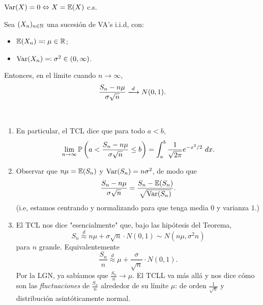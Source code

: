 \begin{note}
	$\operatorname{Var}(X) = 0 \Leftrightarrow X = \mathbb{E}(X)$ c.s.
\end{note}

\begin{theorem}
	Sea $(X_{n})_{n \in \mathbb{N}}$ una sucesión de VA's i.i.d, con:
	\begin{itemize}
		\item $\mathbb{E}(X_{n}) \eqcolon \mu \in \mathbb{R}$;

		\item $\operatorname{Var}(X_{n}) \eqcolon \sigma^{2} \in (0, \infty)$.
	\end{itemize}
	Entonces, en el límite cuando $n \to \infty$,
	\[ \frac{S_{n} - n \mu}{\sigma \sqrt{n}} \xlongrightarrow{d} N(0,1). \]
\end{theorem}

\begin{remark}~
	\begin{enumerate}
		\item En particular, el TCL dice que para todo $a < b$,
		\[ \lim_{n \to \infty} \mathbb{P} \left( a < \frac{S_{n} - n\mu}{\sigma \sqrt{n}} \leq b \right) = \int_{a}^{b} \frac{1}{\sqrt{2 \pi}} e^{-x^{2} \slash 2} \ dx. \]

		\item Observar que $n\mu = \mathbb{E}(S_{n})$ y $\operatorname{Var}(S_{n}) = n \sigma^{2}$, de modo que
		\[ \frac{S_{n} - n\mu}{\sigma \sqrt{n}} = \frac{S_{n} - \mathbb{E}(S_{n})}{\sqrt{\operatorname{Var}(S_{n})}}. \]
		(i.e, estamos centrando y normalizando para que tenga media $0$ y varianza $1$.)

		\item El TCL nos dice "esencialmente" que, bajo las hipótesis del Teorema,
		\[ S_{n} \stackrel{d}{\approx} n\mu + \sigma \sqrt{n} \cdot N(0,1) \sim N(n \mu, \sigma^{2} n) \]
		para $n$ grande. Equivalentemente
		\[ \frac{S_{n}}{n} \stackrel{d}{\approx} \mu + \frac{\sigma}{\sqrt{n}} \cdot N(0,1). \]
		Por la LGN, ya sabíamos que $\frac{S_{n}}{n} \longrightarrow \mu$. El TCLL va más allá y nos dice cómo son las \textit{fluctuaciones} de $\frac{S_{n}}{n}$ alrededor de su límite $\mu$: de orden $\frac{1}{\sqrt{n}}$ y distribución asintóticamente normal.
	\end{enumerate}
\end{remark}
